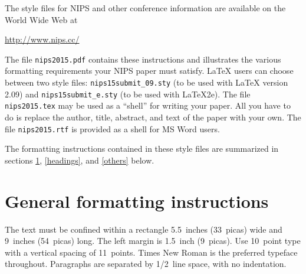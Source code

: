 \documentclass{article} %
\begin{document}
The style files for NIPS and other conference information are available on the World Wide Web at
\begin{center}
   \url{http://www.nips.cc/}
\end{center}
The file \verb+nips2015.pdf+ contains these 
instructions and illustrates the
various formatting requirements your NIPS paper must satisfy. \LaTeX{}
users can choose between two style files:
\verb+nips15submit_09.sty+ (to be used with \LaTeX{} version 2.09) and
\verb+nips15submit_e.sty+ (to be used with \LaTeX{}2e). The file
\verb+nips2015.tex+ may be used as a ``shell'' for writing your paper. All you
have to do is replace the author, title, abstract, and text of the paper with
your own. The file
\verb+nips2015.rtf+ is provided as a shell for MS Word users.

The formatting instructions contained in these style files are summarized in
sections \ref{gen_inst}, \ref{headings}, and \ref{others} below.




\section{General formatting instructions}
\label{gen_inst}

The text must be confined within a rectangle 5.5~inches (33~picas) wide and
9~inches (54~picas) long. The left margin is 1.5~inch (9~picas).
Use 10~point type with a vertical spacing of 11~points. Times New Roman is the
preferred typeface throughout. Paragraphs are separated by 1/2~line space,
with no indentation.
\end{document}
